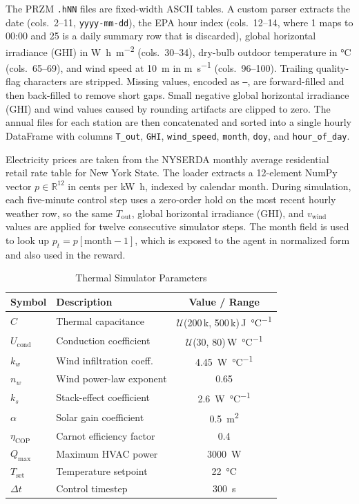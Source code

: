 \documentclass[conference]{IEEEtran}
\newcommand{\acGHI}{global horizontal irradiance (GHI)}
\begin{document}
The PRZM \texttt{.hNN} files are fixed-width ASCII tables. A custom parser
extracts the date (cols.\ 2--11, \texttt{yyyy-mm-dd}), the EPA hour index
(cols.\ 12--14, where 1 maps to 00:00 and 25 is a daily summary row that
is discarded), \acGHI{} in \si{\watt\hour\per\metre\squared}
(cols.\ 30--34), dry-bulb outdoor temperature in \si{\degreeCelsius}
(cols.\ 65--69), and wind speed at \SI{10}{\metre} in
\si{\metre\per\second} (cols.\ 96--100). Trailing quality-flag characters
are stripped. Missing values, encoded as \texttt{---}, are forward-filled
and then back-filled to remove short gaps. Small negative \acGHI{} and
wind values caused by rounding artifacts are clipped to zero. The annual
files for each station are then concatenated and sorted into a single
hourly DataFrame with columns \texttt{T\_out}, \texttt{GHI},
\texttt{wind\_speed}, \texttt{month}, \texttt{doy}, and
\texttt{hour\_of\_day}.

Electricity prices are taken from the NYSERDA monthly average residential
retail rate table for New York State. The loader extracts a 12-element
NumPy vector $p \in \mathbb{R}^{12}$ in cents per
\si{\kilo\watt\hour}, indexed by calendar month. During simulation,
each five-minute control step uses a zero-order hold on the most recent
hourly weather row, so the same $T_{\text{out}}$, \acGHI{}, and
$v_{\text{wind}}$ values are applied for twelve consecutive simulator
steps. The month field is used to look up
$p_t = p[\text{month}-1]$, which is exposed to the agent in normalized
form and also used in the reward.


\begin{table}[!t]
\centering
\caption{Thermal Simulator Parameters}
\label{tab:params}
\begin{tabular}{llc}
\toprule
\textbf{Symbol} & \textbf{Description} & \textbf{Value / Range} \\
\midrule
$C$                 & Thermal capacitance      & $\mathcal{U}$(200\,k, 500\,k)\,\si{\joule\per\degreeCelsius} \\
$U_{\text{cond}}$   & Conduction coefficient   & $\mathcal{U}$(30, 80)\,\si{\watt\per\degreeCelsius} \\
$k_w$               & Wind infiltration coeff. & \SI{4.45}{\watt\per\degreeCelsius} \\
$n_w$               & Wind power-law exponent  & 0.65 \\
$k_s$               & Stack-effect coefficient & \SI{2.6}{\watt\per\degreeCelsius} \\
$\alpha$            & Solar gain coefficient   & \SI{0.5}{\metre\squared} \\
$\eta_{\text{COP}}$ & Carnot efficiency factor & 0.4 \\
$Q_{\max}$          & Maximum HVAC power       & \SI{3000}{\watt} \\
$T_{\text{set}}$    & Temperature setpoint     & \SI{22}{\degreeCelsius} \\
$\Delta t$          & Control timestep         & \SI{300}{\second} \\
\bottomrule
\end{tabular}
\end{table}
\end{document}
